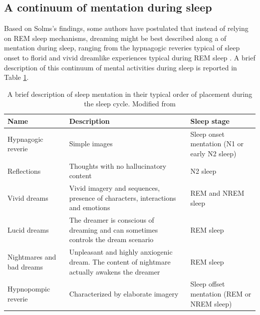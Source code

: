\subsection{A continuum of mentation during sleep}
\label{sec:dream-research:link:continuum}

Based on Solms’s findings, some authors have postulated that instead of relying on REM sleep mechanisms, dreaming might be best described along a  of mentation during sleep, ranging from the hypnagogic reveries typical of sleep onset to florid and vivid dreamlike experiences typical during REM sleep \citep{schwartz_dreaming:_2005}. A brief description of this continuum of mental activities during sleep is reported in Table \ref{tab:intro:continuum}.

\begin{table}[htb]
	\caption[A continuum of sleep mentation]{A brief description of sleep mentation in their typical order of placement during the sleep cycle. Modified from \citet{de_koninck_sleep_2012}}
	\label{tab:intro:continuum}
	\begin{tabularx}{\textwidth}{XXX}
	\toprule
	Name                  		   & Description                                                                          		   & Sleep stage                         			\\ \midrule
	Hypnagogic reverie             & Simple images                                                                                 & Sleep onset mentation (N1 or early N2 sleep) 	\\
	Reflections                    & Thoughts with no hallucinatory content                                                        & N2 sleep                                     	\\
	Vivid dreams                   & Vivid imagery and sequences, presence of characters, interactions and emotions                & REM and NREM sleep                           	\\
	Lucid dreams                   & The dreamer is conscious of dreaming and can sometimes controls the dream scenario            & REM sleep                                    	\\
	Nightmares and bad dreams 	   & Unpleasant and highly anxiogenic dream. The content of nightmare actually awakens the dreamer & REM sleep                                    	\\
	Hypnopompic reverie            & Characterized by elaborate imagery                                                            & Sleep offset mentation (REM or NREM sleep)   	\\ \bottomrule
	\end{tabularx}
\end{table}


